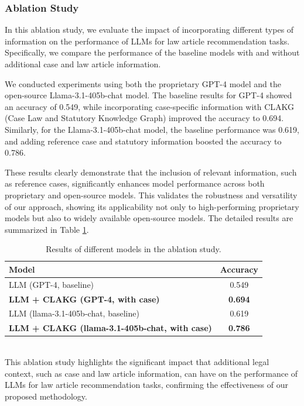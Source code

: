 \documentclass[review,times,nonatbib]{elsarticle} %
\begin{document}
\subsubsection{Ablation Study}
In this ablation study, we evaluate the impact of incorporating different types of information on the performance of LLMs for law article recommendation tasks. Specifically, we compare the performance of the baseline models with and without additional case and law article information.

We conducted experiments using both the proprietary GPT-4 model and the open-source Llama-3.1-405b-chat model. The baseline results for GPT-4 showed an accuracy of 0.549, while incorporating case-specific information with CLAKG (Case Law and Statutory Knowledge Graph) improved the accuracy to 0.694. Similarly, for the Llama-3.1-405b-chat model, the baseline performance was 0.619, and adding reference case and statutory information boosted the accuracy to 0.786.

These results clearly demonstrate that the inclusion of relevant information, such as reference cases, significantly enhances model performance across both proprietary and open-source models. This validates the robustness and versatility of our approach, showing its applicability not only to high-performing proprietary models but also to widely available open-source models.
The detailed results are summarized in Table \ref{tab:ablations}.
\begin{table}[ht]
\centering
\caption{Results of different models in the ablation study.}
\begin{tabular}{l|c}
\textbf{Model} & \textbf{Accuracy} \\
\hline
LLM (GPT-4, baseline) & 0.549 \\ \hline
\textbf{LLM + CLAKG (GPT-4, with case)} & \textbf{0.694} \\ \hline
LLM (llama-3.1-405b-chat, baseline) & 0.619 \\ \hline
\textbf{LLM + CLAKG (llama-3.1-405b-chat, with case)} & \textbf{0.786} \\
\end{tabular}
\label{tab:ablations}
\end{table}\\
This ablation study highlights the significant impact that additional legal context, such as case and law article information, can have on the performance of LLMs for law article recommendation tasks, confirming the effectiveness of our proposed methodology.\\
\end{document}
